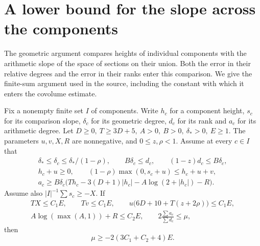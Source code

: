 \section{A lower bound for the slope across the components}
\label{sec:cov-heights}

The geometric argument compares heights of individual components with the
arithmetic slope of the space of sections on their union. Both the error in
their relative degrees and the error in their ranks enter this comparison.
We give the finite-sum argument used in the source, including the constant
with which it enters the covolume estimate.

Fix a nonempty finite set \(I\) of components. Write \(h_c\) for a component
height, \(s_c\) for its comparison slope, \(\delta_c\) for its geometric
degree, \(d_c\) for its rank and \(a_c\) for its arithmetic degree. Let
\(D\ge0,\ T\ge3D+5,\ A>0,\ B>0,\ \delta_*>0,\ E\ge1\). The
parameters \(u,v,X,R\) are nonnegative, and \(0\le z,\rho<1\).
Assume at every \(c\in I\) that
\begin{align}
 \delta_*\le\delta_c\le\delta_* /(1-\rho),\qquad
 B\delta_c\le d_c,\qquad (1-z)d_c\le B\delta_c, \label{eq:cov-shares}\\
 h_c+u\ge0,\qquad
 (1-\rho)\max(0,s_c+u)\le h_c+u+v, \label{eq:cov-shift}\\
 a_c\ge B\delta_c
 \bigl(Th_c-3(D+1)|h_c|-A\log(2+|h_c|)-R\bigr).\label{eq:cov-hs}
\end{align}
Assume also \(|I|^{-1}\sum s_c\ge-X\). If
\begin{align}
 TX\le C_1 E,\qquad Tv\le C_1 E,\qquad
 u\bigl(6D+10+T(z+2\rho)\bigr)\le C_1E, \nonumber\\
 A\log(\max(A,1))+R\le C_2 E,\qquad
 2\frac{\sum a_c}{\sum d_c}\le\mu,\label{eq:cov-budgets}
\end{align}
then
\begin{equation}
                  \mu\ge-2(3C_1+C_2+4)E. \label{eq:cov-u}
\end{equation}

